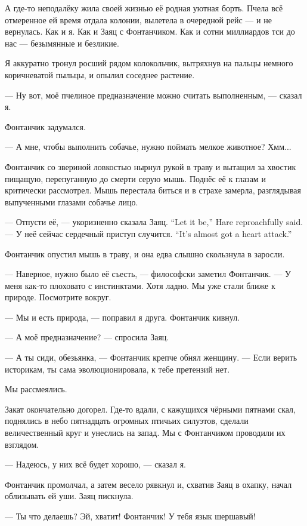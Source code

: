 А где-то неподалёку жила своей жизнью её родная уютная борть.
Пчела всё отмеренное ей время отдала колонии, вылетела в очередной рейс --- и не вернулась.
Как и я.
Как и Заяц с Фонтанчиком.
Как и сотни миллиардов тси до нас --- безымянные и безликие.

Я аккуратно тронул росший рядом колокольчик, вытряхнув на пальцы немного коричневатой пыльцы, и опылил соседнее растение.

--- Ну вот, моё пчелиное предназначение можно считать выполненным, --- сказал я.

Фонтанчик задумался.

--- А мне, чтобы выполнить собачье, нужно поймать мелкое животное?
Хмм...

Фонтанчик со звериной ловкостью нырнул рукой в траву и вытащил за хвостик пищащую, перепуганную до смерти серую мышь.
Поднёс её к глазам и критически рассмотрел.
Мышь перестала биться и в страхе замерла, разглядывая выпученными глазами собачье лицо.

{--- Отпусти её, --- укоризненно сказала Заяц.}
{``Let it be,'' Hare reproachfully said.}
{--- У неё сейчас сердечный приступ случится.}
{``It's almost got a heart attack.''}

Фонтанчик опустил мышь в траву, и она едва слышно скользнула в заросли.

--- Наверное, нужно было её съесть, --- философски заметил Фонтанчик.
--- У меня как-то плоховато с инстинктами.
Хотя ладно.
Мы уже стали ближе к природе.
Посмотрите вокруг.

--- Мы и есть природа, --- поправил я друга.
Фонтанчик кивнул.

--- А моё предназначение? --- спросила Заяц.

--- А ты сиди, обезьянка, --- Фонтанчик крепче обнял женщину.
--- Если верить историкам, ты сама эволюционировала, к тебе претензий нет.

Мы рассмеялись.

Закат окончательно догорел.
Где-то вдали, с кажущихся чёрными пятнами скал, поднялись в небо пятнадцать огромных птичьих силуэтов, сделали величественный круг и унеслись на запад.
Мы с Фонтанчиком проводили их взглядом.

--- Надеюсь, у них всё будет хорошо, --- сказал я.

Фонтанчик промолчал, а затем весело рявкнул и, схватив Заяц в охапку, начал облизывать ей уши.
Заяц пискнула.

--- Ты что делаешь?
Эй, хватит!
Фонтанчик!
У тебя язык шершавый!

